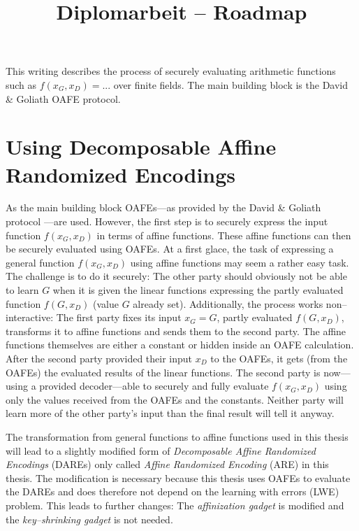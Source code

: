 \documentclass[12pt, a4paper]{article}
\title{Diplomarbeit -- Roadmap}
\begin{document}
\maketitle

This writing describes the process of securely evaluating arithmetic functions
such as $f(x_G,x_D) = ...$ over finite fields. The main building block is the
David \& Goliath OAFE protocol\cite{davidgoliath}.

\section{Using Decomposable Affine Randomized Encodings}
\label{sec:using-dare}

As the main building block OAFEs---as provided by the David \& Goliath protocol
\cite{davidgoliath}---are used. However, the first step is to securely express
the input function $f(x_G, x_D)$ in terms of affine functions. These affine
functions can then be securely evaluated using OAFEs. At a first glace, the task
of expressing a general function $f(x_G, x_D)$ using affine functions may seem a
rather easy task. The challenge is to do it securely: The other party should
obviously not be able to learn $G$ when it is given the linear functions
expressing the partly evaluated function $f(G, x_D)$ (value $G$ already set).
Additionally, the process works non--interactive: The first party fixes its
input $x_G = G$, partly evaluated $f(G, x_D)$, transforms it to affine functions
and sends them to the second party. The affine functions themselves are either a
constant or hidden inside an OAFE calculation. After the second party provided
their input $x_D$ to the OAFEs, it gets (from the OAFEs) the evaluated results
of the linear functions. The second party is now---using a provided
decoder---able to securely and fully evaluate $f(x_G, x_D)$ using only the
values received from the OAFEs and the constants. Neither party will learn more
of the other party's input than the final result will tell it anyway.

The transformation from general functions to affine functions used in this
thesis will lead to a slightly modified form of \emph{Decomposable Affine
Randomized Encodings} (DAREs) \cite{gac2012} only called \emph{Affine Randomized
Encoding} (ARE) in this thesis. The modification is necessary because this
thesis uses OAFEs to evaluate the DAREs and does therefore not depend on the
learning with errors (LWE) problem. This leads to further changes: The
\emph{affinization gadget} \cite{gac2012} is modified and the
\emph{key--shrinking gadget} \cite{gac2012} is not needed.
\end{document}
